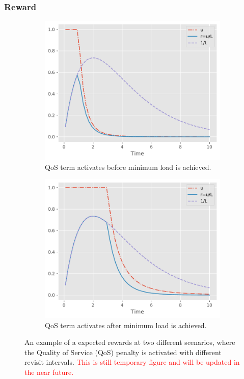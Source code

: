 \documentclass[english, 12pt, a4paper, elec, utf8, a-1b, online]{aaltothesis}
\begin{document}
\subsubsection{Reward} \label{sec:rewards}

\begin{figure}[h]
    \centering
    \begin{subfigure}[b]{0.45\textwidth}
        \centering
        \includegraphics[width=\textwidth]{figures/reward.pdf}
        \caption{QoS term activates before minimum load is achieved.}
    \end{subfigure}
    \begin{subfigure}[b]{0.45\textwidth}
        \centering
        \includegraphics[width=\textwidth]{figures/reward2.pdf}
        \caption{QoS term activates after minimum load is achieved.}
    \end{subfigure}
    \caption{An example of a expected rewards at two different scenarios, where the Quality of Service (QoS) penalty is activated with different revisit intervals. \textcolor{red}{This is still temporary figure and will be updated in the near future.}
    }
    \label{fig:my_label}
\end{figure}
\end{document}
